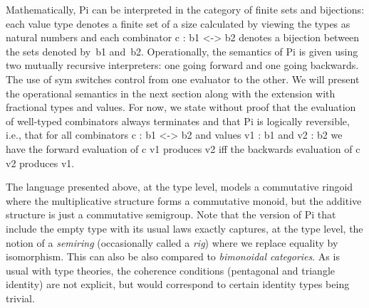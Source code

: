 \documentclass{llncs}
\newcommand{\jacques}[1]{\textsc{Jacques says:} #1}
\begin{document}


Mathematically, {{Pi}} can be interpreted in the category of finite sets and
bijections: each value type denotes a finite set of a size calculated by
viewing the types as natural numbers and each combinator {{c : b1 <-> b2}}
denotes a bijection between the sets denoted by~{{b1}}
and~{{b2}}. Operationally, the semantics of {{Pi}} is given using two
mutually recursive interpreters: one going forward and one going
backwards. The use of {{sym}} switches control from one evaluator to the
other. We will present the operational semantics in the next section along
with the extension with fractional types and values. For now, we state
without proof that the evaluation of well-typed combinators always terminates
and that {{Pi}} is logically reversible, i.e., that for all combinators 
{{c : b1 <-> b2}} and values {{v1 : b1}} and {{v2 : b2}} we have the forward
evaluation of {{c v1}} produces {{v2}} iff the backwards evaluation of 
{{c v2}} produces {{v1}}.


The language presented above, at the type level, models a commutative ringoid
where the multiplicative structure forms a commutative monoid, but the
additive structure is just a commutative semigroup.  Note that the version of
{{Pi}} that include the empty type with its usual laws exactly captures, at
the type level, the notion of a \emph{semiring} (occasionally called a
\emph{rig}) where we replace equality by isomorphism.  This can also be also
compared to \emph{bimonoidal categories}.  As is usual with type theories,
the coherence conditions (pentagonal and triangle identity) are not explicit,
but would correspond to certain identity types being trivial.
\end{document}
